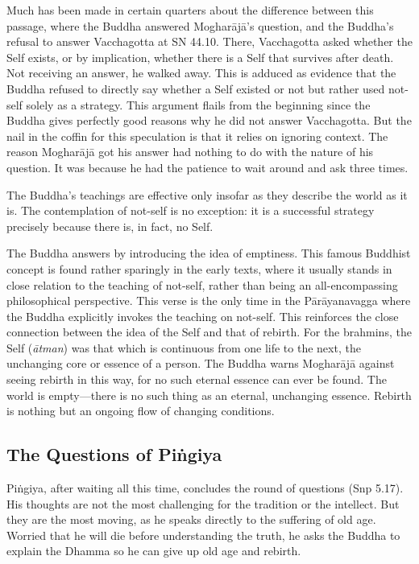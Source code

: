 \documentclass[12pt,openany]{book}%
\begin{document}
Much has been made in certain quarters about the difference between this passage, where the Buddha answered \textsanskrit{Mogharājā}’s question, and the Buddha’s refusal to answer Vacchagotta at SN 44.10. There, Vacchagotta asked whether the Self exists, or by implication, whether there is a Self that survives after death. Not receiving an answer, he walked away. This is adduced as evidence that the Buddha refused to directly say whether a Self existed or not but rather used not-self solely as a strategy. This argument flails from the beginning since the Buddha gives perfectly good reasons why he did not answer Vacchagotta. But the nail in the coffin for this speculation is that it relies on ignoring context. The reason \textsanskrit{Mogharājā} got his answer had nothing to do with the nature of his question. It was because he had the patience to wait around and ask three times.

The Buddha’s teachings are effective only insofar as they describe the world as it is. The contemplation of not-self is no exception: it is a successful strategy precisely because there is, in fact, no Self.

The Buddha answers by introducing the idea of emptiness. This famous Buddhist concept is found rather sparingly in the early texts, where it usually stands in close relation to the teaching of not-self, rather than being an all-encompassing philosophical perspective. This verse is the only time in the \textsanskrit{Pārāyanavagga} where the Buddha explicitly invokes the teaching on not-self. This reinforces the close connection between the idea of the Self and that of rebirth. For the brahmins, the Self (\textit{\textsanskrit{ātman}}) was that which is continuous from one life to the next, the unchanging core or essence of a person. The Buddha warns \textsanskrit{Mogharājā} against seeing rebirth in this way, for no such eternal essence can ever be found. The world is empty—there is no such thing as an eternal, unchanging essence. Rebirth is nothing but an ongoing flow of changing conditions.

\subsection*{The Questions of \textsanskrit{Piṅgiya}}

\textsanskrit{Piṅgiya}, after waiting all this time, concludes the round of questions (Snp 5.17). His thoughts are not the most challenging for the tradition or the intellect. But they are the most moving, as he speaks directly to the suffering of old age. Worried that he will die before understanding the truth, he asks the Buddha to explain the Dhamma so he can give up old age and rebirth.
\end{document}
